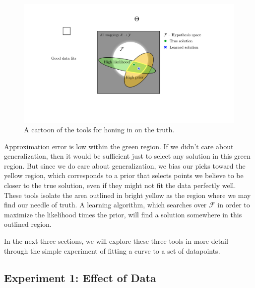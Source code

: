 \begin{figure}[t]
    \centerline{
    \includegraphics[width=0.65\linewidth]{./figures/problem_of_generalization/search_space_tools.pdf}
    }
    \caption{A cartoon of the tools for honing in on the truth.}
    \label{fig:problem_of_generalization:search_space_tools}
\end{figure}


Approximation error is low within the green region. If we didn't care about generalization, then it would be sufficient just to select any solution in this green region. But since we do care about generalization, we bias our picks toward the yellow region, which corresponds to a prior that selects points we believe to be closer to the true solution, even if they might not fit the data perfectly well. These tools isolate the area outlined in bright yellow as the region where we may find our needle of truth. A learning algorithm, which searches over $\mathcal{F}$ in order to maximize the likelihood times the prior, will find a solution somewhere in this outlined region. %

In the next three sections, we will explore these three tools in more detail through the simple experiment of fitting a curve to a set of datapoints.


\subsection{Experiment 1: Effect of Data}

